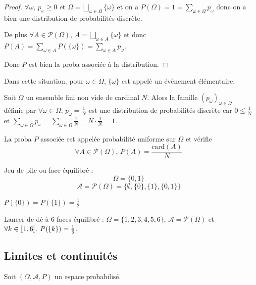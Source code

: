 \begin{proof}
    $\forall \omega, \, p_\omega \geqslant 0$ et $\displaystyle \Omega = \bigsqcup_{\omega \in \Omega} \{\omega\}$
    et on a $\displaystyle P(\Omega) = 1 = \sum_{\omega \in \Omega}  p_\omega$ donc 
    on a bien une distribution de probabilités discrète.

    De plus $\forall A \in \mathscr P(\Omega)$, 
    $\displaystyle A = \bigsqcup_{\omega \in A} \{\omega\}$ et donc $\displaystyle P(A) = \sum_{\omega \in A} P(\{\omega\}) = \sum_{\omega \in A} p_\omega$.

    Donc $P$ est bien la proba associée à la distribution. 
\end{proof}

\begin{remarque}
    Dans cette situation, pour $\omega \in \Omega, \, \{\omega\}$ est appelé un évènement élémentaire.
\end{remarque}

\begin{exemple}
    Soit $\Omega$ un ensemble fini non vide de cardinal $N$. Alors la famille 
    $(p_\omega)_{\omega \in \Omega}$ définie par
    $\forall \omega \in \Omega, \, p_\omega = \frac 1 N$
    est une distribution de probabilités discrète car 
    $0 \leqslant \frac 1 N $ et $\displaystyle \sum_{\omega \in \Omega} p_\omega = \sum_{\omega \in \Omega} \frac 1 N = N \cdot \frac 1 N = 1$.

    La proba $P$ associée est appelée probabilité uniforme sur $\Omega$ et vérifie 
    $$\forall A \in \mathscr P(\Omega), \, P(A) = \frac{\text{card}(A)}{N}$$
\end{exemple}

\begin{exemple}
    Jeu de pile ou face équilibré :
    $$ \Omega = \{0, 1\}$$
    $$ \mathcal A = \mathscr P(\Omega) = \{\emptyset, \{0\}, \{1\}, \{0, 1\}\}$$

    $P(\{0\}) = P(\{1\}) = \frac 1 2$

    Lancer de dé à 6 faces équilibré : 
    $ \Omega = \{1, 2, 3, 4, 5, 6\}$, $\mathcal A = \mathscr P(\Omega)$ et
    $\forall k \in [\![1, 6]\!], \, P(\{k\}) = \frac 1 6$. 
\end{exemple}

\subsection{Limites et continuités}

Soit $(\Omega, \mathcal A, P)$ un espace probabilisé.

